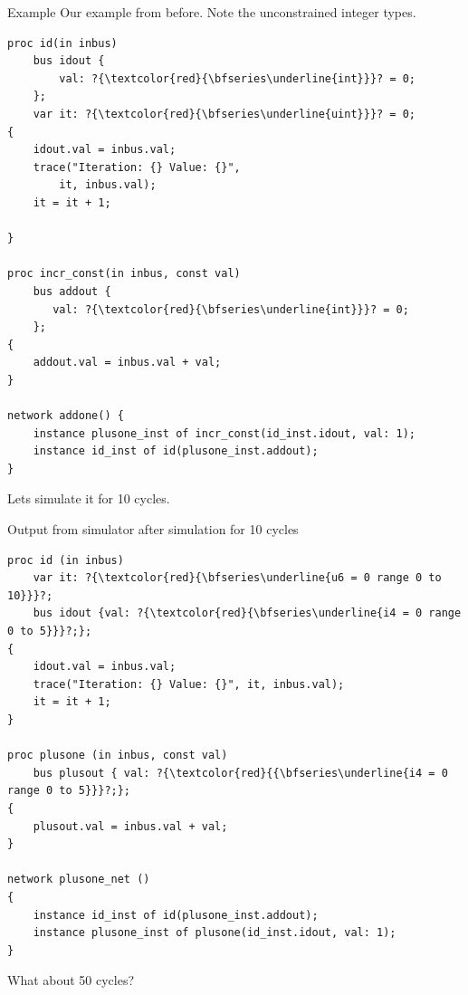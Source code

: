 \documentclass{beamer}
\begin{document}
\begin{frame}[fragile]{Example}
Our example from before. Note the unconstrained integer types.
\begin{lstlisting}[language=smeil]
proc id(in inbus)
    bus idout {
        val: ?{\textcolor{red}{\bfseries\underline{int}}}? = 0;
    };
    var it: ?{\textcolor{red}{\bfseries\underline{uint}}}? = 0;
{
    idout.val = inbus.val;
    trace("Iteration: {} Value: {}",
        it, inbus.val);
    it = it + 1;

}

proc incr_const(in inbus, const val)
    bus addout {
       val: ?{\textcolor{red}{\bfseries\underline{int}}}? = 0;
    };
{
    addout.val = inbus.val + val;
}

network addone() {
    instance plusone_inst of incr_const(id_inst.idout, val: 1);
    instance id_inst of id(plusone_inst.addout);
}

\end{lstlisting}


  Lets simulate it for 10 cycles.
\end{frame}

\begin{frame}[fragile]
  Output from simulator after simulation for 10 cycles
\begin{lstlisting}[language=smeil]
proc id (in inbus)
    var it: ?{\textcolor{red}{\bfseries\underline{u6 = 0 range 0 to 10}}}?;
    bus idout {val: ?{\textcolor{red}{\bfseries\underline{i4 = 0 range 0 to 5}}}?;};
{
    idout.val = inbus.val;
    trace("Iteration: {} Value: {}", it, inbus.val);
    it = it + 1;
}

proc plusone (in inbus, const val)
    bus plusout { val: ?{\textcolor{red}{{\bfseries\underline{i4 = 0 range 0 to 5}}}?;};
{
    plusout.val = inbus.val + val;
}

network plusone_net ()
{
    instance id_inst of id(plusone_inst.addout);
    instance plusone_inst of plusone(id_inst.idout, val: 1);
}

\end{lstlisting}
  
  What about 50 cycles?


  
\end{frame}
\end{document}
